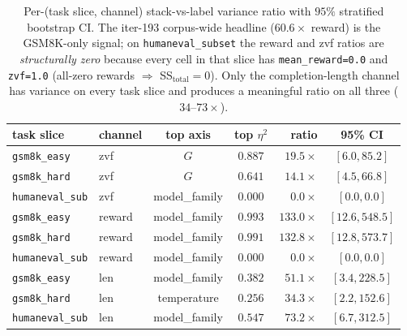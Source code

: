 \documentclass{article}  \usepackage[preprint,nonatbib]{neurips_2026} \usepackage[numbers]{natbib}
\begin{document}
\begin{table}[t]
\centering\small
\caption{Per-(task slice, channel) stack-vs-label variance ratio with
$95\%$ stratified bootstrap CI. The iter-193 corpus-wide headline
($60.6\times$ reward) is the GSM8K-only signal; on
\texttt{humaneval\_subset} the reward and zvf ratios are
\emph{structurally zero} because every cell in that slice has
\texttt{mean\_reward=0.0} and \texttt{zvf=1.0} (all-zero rewards
$\Rightarrow$ SS$_{\text{total}}=0$). Only the completion-length
channel has variance on every task slice and produces a meaningful
ratio on all three ($34$--$73\times$).}
\label{tab:p5-iter201-per-task}
\begin{tabular}{llccrc}
\toprule
task slice & channel & top axis & top $\eta^2$ & ratio & 95\% CI \\
\midrule
\texttt{gsm8k\_easy}      & zvf    & $G$             & $0.887$ & $19.5\times$  & $[6.0, 85.2]$ \\
\texttt{gsm8k\_hard}      & zvf    & $G$             & $0.641$ & $14.1\times$  & $[4.5, 66.8]$ \\
\texttt{humaneval\_sub}   & zvf    & model\_family   & $0.000$ & $0.0\times$   & $[0.0, 0.0]$ \\
\midrule
\texttt{gsm8k\_easy}      & reward & model\_family   & $0.993$ & $133.0\times$ & $[12.6, 548.5]$ \\
\texttt{gsm8k\_hard}      & reward & model\_family   & $0.991$ & $132.8\times$ & $[12.8, 573.7]$ \\
\texttt{humaneval\_sub}   & reward & model\_family   & $0.000$ & $0.0\times$   & $[0.0, 0.0]$ \\
\midrule
\texttt{gsm8k\_easy}      & len    & model\_family   & $0.382$ & $51.1\times$  & $[3.4, 228.5]$ \\
\texttt{gsm8k\_hard}      & len    & temperature     & $0.256$ & $34.3\times$  & $[2.2, 152.6]$ \\
\texttt{humaneval\_sub}   & len    & model\_family   & $0.547$ & $73.2\times$  & $[6.7, 312.5]$ \\
\bottomrule
\end{tabular}
\end{table}
\end{document}
